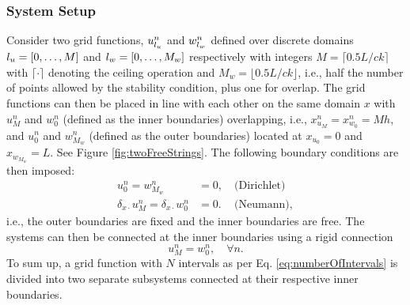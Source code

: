 \subsubsection{System Setup}\label{sec:systSetup}
Consider two grid functions, $u_{l_u}^n$ and $w_{l_w}^n$ defined over discrete domains ${l_u} = [0, \hdots, M]$ and ${l_w} = [0, \hdots, M_w]$ respectively with integers $M = \lceil 0.5L/ck\rceil $ with $\lceil \cdot \rceil$ denoting the ceiling operation and $M_w = \lfloor 0.5L/ck\rfloor$, i.e., half the number of points allowed by the stability condition, plus one for overlap. The grid functions can then be placed in line with each other on the same domain $x$ with $u_M^n$ and $w_0^n$ (defined as the inner boundaries) overlapping, i.e., $x_{u_M}^n = x_{w_0}^n = Mh$, and $u_0^n$ and $w_{M_w}^n$ (defined as the outer boundaries) located at $x_{u_0} = 0$ and $x_{w_{M_w}} = L$. See Figure \ref{fig:twoFreeStrings}. The following boundary conditions are then imposed:
\begin{subequations}\label{eq:halfStringBoundaryCond}
    \begin{align}
        u_0^n = w_{M_w}^n &= 0,\quad \text{(Dirichlet)}\label{eq:halfStringBoundaryCondDirichlet}\\
        \delta_{x\cdot}u_M^n = \delta_{x\cdot}w_0^n &= 0.\, \quad\text{(Neumann)}, \label{eq:halfStringBoundaryCondNeumann}
    \end{align}
\end{subequations}
i.e., the outer boundaries are fixed and the inner boundaries are free.
%
%
The systems can then be connected at the inner boundaries using a rigid connection
\begin{equation}\label{eq:rigid}
    u_M^n = w_0^n,\quad \forall n.
\end{equation}
To sum up, a grid function with $N$ intervals as per Eq. \eqref{eq:numberOfIntervals} is divided into two separate subsystems connected at their respective inner boundaries. 

